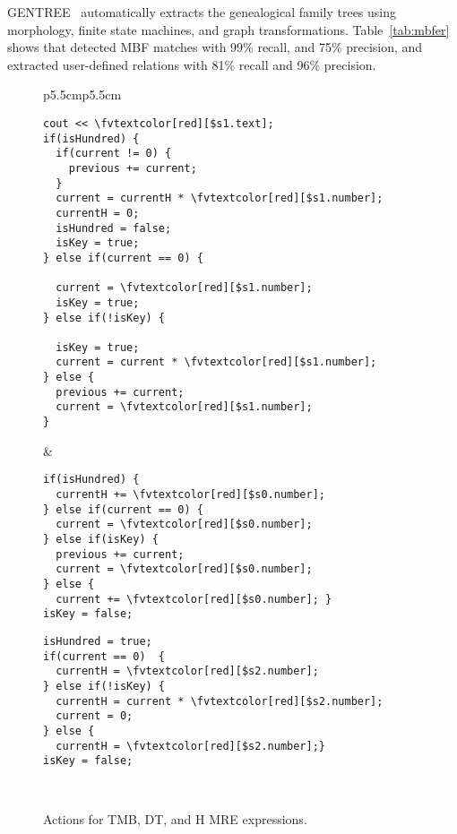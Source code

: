 GENTREE~\cite{ZaMaHaCicling2012Entity} 
automatically extracts the genealogical family trees using morphology, 
finite state machines, and graph transformations. 
Table~\ref{tab:mbfer} shows that \framework detected 
MBF matches with 99\% recall, and 75\% precision, and
extracted user-defined relations with 81\% recall and 96\% precision.

\newcommand*{\fvtextcolor}[2]{\textcolor{#1}{#2}}
\begin{figure}[tb!]
\centering
  \begin{tabular}{p{5.5cm}p{5.5cm}}
\begin{Verbatim}[fontsize=\relsize{-1},frame=single,label=TMB algorithm,commandchars=\\\[\]] 
cout << \fvtextcolor[red][$s1.text];
if(isHundred) {
  if(current != 0) {
    previous += current;
  }
  current = currentH * \fvtextcolor[red][$s1.number];
  currentH = 0;
  isHundred = false;
  isKey = true;
} else if(current == 0) {
  
  current = \fvtextcolor[red][$s1.number];
  isKey = true;
} else if(!isKey) {

  isKey = true;
  current = current * \fvtextcolor[red][$s1.number];
} else {
  previous += current;
  current = \fvtextcolor[red][$s1.number];
}
\end{Verbatim}
&
\begin{Verbatim}[fontsize=\relsize{-1},frame=single,label=DT algorithm,commandchars=\\\[\]] 
if(isHundred) {
  currentH += \fvtextcolor[red][$s0.number];
} else if(current == 0) {
  current = \fvtextcolor[red][$s0.number];
} else if(isKey) {
  previous += current;
  current = \fvtextcolor[red][$s0.number];
} else {
  current += \fvtextcolor[red][$s0.number]; }
isKey = false;
\end{Verbatim}
\begin{Verbatim}[fontsize=\relsize{-1},frame=single,label=H algorithm,commandchars=\\\[\]] 
isHundred = true;
if(current == 0)  {
  currentH = \fvtextcolor[red][$s2.number];
} else if(!isKey) {
  currentH = current * \fvtextcolor[red][$s2.number];
  current = 0;
} else {
  currentH = \fvtextcolor[red][$s2.number];}
isKey = false;
\end{Verbatim}
\\ 
\end{tabular}
\caption{Actions for TMB, DT, and H MRE expressions.}
\label{fig:numnormalgo}
\end{figure}

